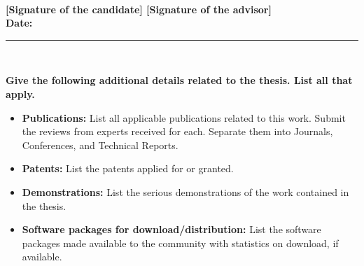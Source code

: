 \documentclass[11pt]{article}
\begin{document}
\ \\[7mm]

{\small\bf [Signature of the candidate] \hfill [Signature of the advisor]}
\\[2mm]
{\bf Date:}\\[-2mm]
\hrule

\ \\[-4mm]

{\small
{\normalsize\bf Give the following additional details related to the
  thesis. List all that apply.}
\begin{itemize}\itemsep=0mm
\item {\bf Publications:} List all applicable publications related to this
work.  Submit the reviews from experts received for each. Separate them
into Journals, Conferences, and Technical Reports.
\item {\bf Patents:} List the patents applied for or granted.
\item {\bf Demonstrations:} List the serious demonstrations of the work contained
in the thesis.
\item {\bf Software packages for download/distribution:} List the software packages
made available to the community with statistics on download, if available.
\end{itemize}}
\hspace*{\fill}{\tiny P J Narayanan. Sep 2009}
\end{document}
